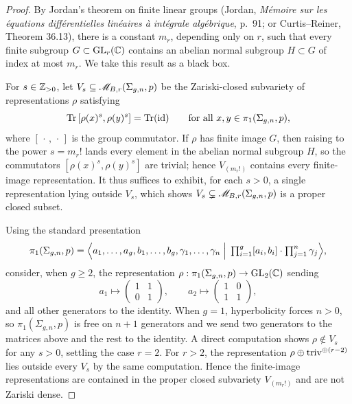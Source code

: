 \begin{proof}
  By Jordan's theorem on finite linear groups (Jordan, \emph{M\'emoire sur les
  \'equations diff\'erentielles lin\'eaires \`a int\'egrale alg\'ebrique}, p.~91;
  or Curtis--Reiner, Theorem 36.13), there is a constant $m_r$, depending only on
  $r$, such that every finite subgroup $G \subset \operatorname{GL}_r(\mathbb{C})$ contains an abelian
  normal subgroup $H \subset G$ of index at most $m_r$. We take this result as a
  black box.

  For $s \in \mathbb{Z}_{>0}$, let $V_s \subseteq \mathscr{M}_{B,r}(\Sigma_{g,n}, p)$ be the
  Zariski-closed subvariety of representations $\rho$ satisfying
  \[
    \operatorname{Tr}\,[\rho(x)^s, \rho(y)^s] = \operatorname{Tr}(\operatorname{id})
    \qquad \text{for all } x, y \in \pi_1(\Sigma_{g,n}, p),
  \]
  where $[\,\cdot\,,\,\cdot\,]$ is the group commutator. If $\rho$ has finite
  image $G$, then raising to the power $s = m_r!$ lands every element in the
  abelian normal subgroup $H$, so the commutators $[\rho(x)^s, \rho(y)^s]$ are
  trivial; hence $V_{(m_r!)}$ contains every finite-image representation. It thus
  suffices to exhibit, for each $s > 0$, a single representation lying outside
  $V_s$, which shows $V_s \subsetneq \mathscr{M}_{B,r}(\Sigma_{g,n}, p)$ is a proper
  closed subset.

  Using the standard presentation
  \[
    \pi_1(\Sigma_{g,n}, p) = \Bigl\langle a_1, \ldots, a_g, b_1, \ldots, b_g,
      \gamma_1, \ldots, \gamma_n \;\Big|\;
      \textstyle\prod_{i=1}^g [a_i, b_i] \cdot \prod_{j=1}^n \gamma_j
    \Bigr\rangle,
  \]
  consider, when $g \ge 2$, the representation
  $\rho : \pi_1(\Sigma_{g,n}, p) \to \operatorname{GL}_2(\mathbb{C})$ sending
  \[
    a_1 \mapsto \begin{pmatrix} 1 & 1 \\ 0 & 1 \end{pmatrix},
    \qquad
    a_2 \mapsto \begin{pmatrix} 1 & 0 \\ 1 & 1 \end{pmatrix},
  \]
  and all other generators to the identity. When $g = 1$, hyperbolicity forces
  $n > 0$, so $\pi_1(\Sigma_{g,n}, p)$ is free on $n + 1$ generators and we send
  two generators to the matrices above and the rest to the identity. A direct
  computation shows $\rho \notin V_s$ for any $s > 0$, settling the case $r = 2$.
  For $r > 2$, the representation $\rho \oplus \operatorname{triv}^{\oplus (r-2)}$ lies
  outside every $V_s$ by the same computation. Hence the finite-image
  representations are contained in the proper closed subvariety $V_{(m_r!)}$ and
  are not Zariski dense.
\end{proof}
